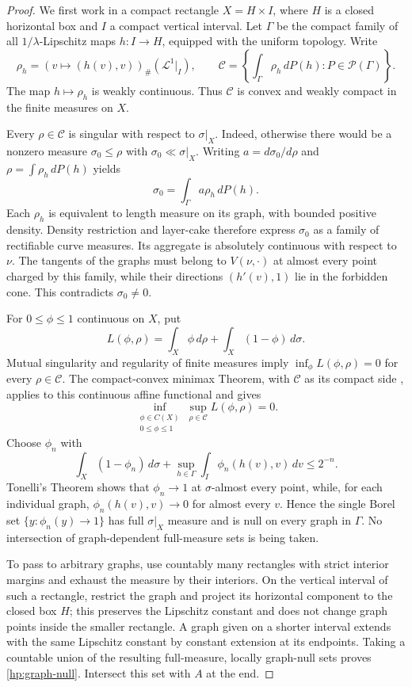 \documentclass[11pt]{article}
\numberwithin{equation}{section}
\theoremstyle{definition}
\theoremstyle{remark}
\begin{document}
\begin{proof}
We first work in a compact rectangle $X=H\times I$, where $H$ is a
closed horizontal box and $I$ a compact vertical interval.  Let
$\Gamma$ be the compact family of all $1/\lambda$-Lipschitz maps
$h:I\to H$, equipped with the uniform topology.  Write
\[
 \rho_h=(v\mapsto(h(v),v))_\#(\mathcal L^1\vert_I),
 \qquad
 \mathcal C=\left\{\int_\Gamma\rho_h\,dP(h):
                         P\in\mathcal P(\Gamma)\right\}.
\]
The map $h\mapsto\rho_h$ is weakly continuous.  Thus $\mathcal C$
is convex and weakly compact in the finite measures on $X$.

Every $\rho\in\mathcal C$ is singular with respect to
$\sigma\vert_X$.  Indeed, otherwise there would be a nonzero measure
$\sigma_0\le\rho$ with $\sigma_0\ll\sigma\vert_X$.  Writing
$a=d\sigma_0/d\rho$ and $\rho=\int\rho_h\,dP(h)$ yields
\[
 \sigma_0=\int_\Gamma a\rho_h\,dP(h).
\]
Each $\rho_h$ is equivalent to length measure on its graph, with
bounded positive density.  Density restriction and layer-cake
therefore express $\sigma_0$ as a family of rectifiable curve measures.
Its aggregate is absolutely continuous with respect to $\nu$.
The tangents of the graphs must belong to $V(\nu,\cdot)$ at almost
every point charged by this family, while their directions
$(h'(v),1)$ lie in the forbidden cone.  This contradicts
$\sigma_0\ne0$.

For $0\le\phi\le1$ continuous on $X$, put
\[
 L(\phi,\rho)=\int_X\phi\,d\rho
                 +\int_X(1-\phi)\,d\sigma.
\]
Mutual singularity and regularity of finite measures imply
$\inf_\phi L(\phi,\rho)=0$ for every $\rho\in\mathcal C$.
The compact-convex minimax Theorem, with $\mathcal C$ as its compact
side \cite[Theorem~4.2]{Sion1958}, applies to this continuous affine functional
and gives
\[
 \inf_{\substack{\phi\in C(X)\\0\le\phi\le1}}
     \sup_{\rho\in\mathcal C}L(\phi,\rho)=0.
\]
Choose $\phi_n$ with
\[
 \int_X(1-\phi_n)\,d\sigma
       +\sup_{h\in\Gamma}\int_I\phi_n(h(v),v)\,dv
 \le2^{-n}.
\]
Tonelli's Theorem shows that $\phi_n\to1$ at $\sigma$-almost every
point, while, for each individual graph, $\phi_n(h(v),v)\to0$
for almost every $v$.  Hence the single Borel set
$\{y:\phi_n(y)\to1\}$ has full $\sigma\vert_X$ measure and is
null on every graph in $\Gamma$.  No intersection of graph-dependent
full-measure sets is being taken.

To pass to arbitrary graphs, use countably many rectangles with
strict interior margins and exhaust the measure by their interiors.
On the vertical interval of such a rectangle, restrict the graph
and project its horizontal component to the closed box $H$; this
preserves the Lipschitz constant and does not change graph points
inside the smaller rectangle.  A graph given on a shorter interval
extends with the same Lipschitz constant by constant extension at its
endpoints.  Taking a countable union of the resulting full-measure,
locally graph-null sets proves \eqref{hp:graph-null}.  Intersect this
set with $A$ at the end.
\end{proof}
\end{document}
